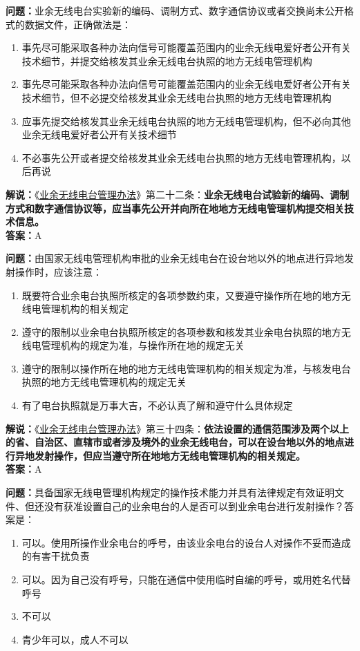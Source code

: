 \textbf{问题：}业余无线电台实验新的编码、调制方式、数字通信协议或者交换尚未公开格式的数据文件，正确做法是：
\begin{enumerate}[label=\Alph*), leftmargin=1cm]
	\item 事先尽可能采取各种办法向信号可能覆盖范围内的业余无线电爱好者公开有关技术细节，并提交给核发其业余无线电台执照的地方无线电管理机构
	\item 事先尽可能采取各种办法向信号可能覆盖范围内的业余无线电爱好者公开有关技术细节，但不必提交给核发其业余无线电台执照的地方无线电管理机构
	\item 应事先提交给核发其业余无线电台执照的地方无线电管理机构，但不必向其他业余无线电爱好者公开有关技术细节
	\item 不必事先公开或者提交给核发其业余无线电台执照的地方无线电管理机构，以后再说
\end{enumerate}
\textbf{解说：}《\href{https://www.miit.gov.cn/jgsj/zfs/bmgz/art/2020/art_147b69815b3641caad9047735f94c860.html}{业余无线电台管理办法}》第二十二条：\textbf{业余无线电台试验新的编码、调制方式和数字通信协议等，应当事先公开并向所在地地方无线电管理机构提交相关技术信息。}\\\textbf{答案：}A

\textbf{问题：}由国家无线电管理机构审批的业余无线电台在设台地以外的地点进行异地发射操作时，应该注意：
\begin{enumerate}[label=\Alph*), leftmargin=1cm]
	\item 既要符合业余电台执照所核定的各项参数约束，又要遵守操作所在地的地方无线电管理机构的相关规定
	\item 遵守的限制以业余电台执照所核定的各项参数和核发其业余电台执照的地方无线电管理机构的规定为准，与操作所在地的规定无关
	\item 遵守的限制以操作所在地的地方无线电管理机构的相关规定为准，与核发电台执照的地方无线电管理机构的规定无关
	\item 有了电台执照就是万事大吉，不必认真了解和遵守什么具体规定
\end{enumerate}
\textbf{解说：}《\href{https://www.miit.gov.cn/jgsj/zfs/bmgz/art/2020/art_147b69815b3641caad9047735f94c860.html}{业余无线电台管理办法}》第三十四条：\textbf{依法设置的通信范围涉及两个以上的省、自治区、直辖市或者涉及境外的业余无线电台，可以在设台地以外的地点进行异地发射操作，但应当遵守所在地地方无线电管理机构的相关规定。}\\\textbf{答案：}A

\textbf{问题：}具备国家无线电管理机构规定的操作技术能力并具有法律规定有效证明文件、但还没有获准设置自己的业余电台的人是否可以到业余电台进行发射操作？答案是：
\begin{enumerate}[label=\Alph*), leftmargin=1cm]
	\item 可以。使用所操作业余电台的呼号，由该业余电台的设台人对操作不妥而造成的有害干扰负责
	\item 可以。因为自己没有呼号，只能在通信中使用临时自编的呼号，或用姓名代替呼号
	\item 不可以
	\item 青少年可以，成人不可以
\end{enumerate}

